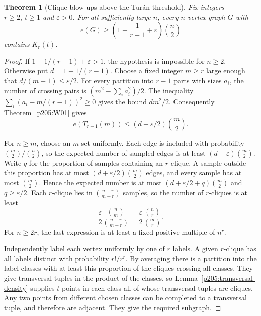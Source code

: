 \documentclass[11pt,oneside,openany]{book}
\theoremstyle{plain}
\newtheorem{theorem}{Theorem}[chapter]
\theoremstyle{definition}
\theoremstyle{remark}
\begin{document}
\begin{theorem}[Clique blow-ups above the Tur\'an threshold]\label{p205:W03}
Fix integers \(r\ge2,\ t\ge1\) and \(\varepsilon>0\). For all
sufficiently large \(n\), every \(n\)-vertex graph \(G\) with
\[
  e(G)\ge \left(1-\frac1{r-1}+\varepsilon\right)\binom n2
\]
contains \(K_r(t)\).
\end{theorem}
\begin{proof}
If \(1-1/(r-1)+\varepsilon>1\), the hypothesis is impossible for
\(n\ge2\). Otherwise put \(d=1-1/(r-1)\). Choose a fixed integer
\(m\ge r\) large enough that \(d/(m-1)\le\varepsilon/2\).
For every partition into \(r-1\) parts with sizes \(a_i\), the number
of crossing pairs is \((m^2-\sum_i a_i^2)/2\). The inequality
\(\sum_i(a_i-m/(r-1))^2\ge0\) gives the bound \(d m^2/2\).
Consequently Theorem~\ref{p205:W01} gives
\[
  e(T_{r-1}(m))\le(d+\varepsilon/2)\binom m2.
\]

For \(n\ge m\), choose an \(m\)-set uniformly. Each edge is included
with probability \(\binom m2/\binom n2\), so the expected number of
sampled edges is at least \((d+\varepsilon)\binom m2\). Write \(q\)
for the proportion of samples containing an \(r\)-clique. A sample
outside this proportion has at most \((d+\varepsilon/2)\binom m2\)
edges, and every sample has at most \(\binom m2\). Hence the
expected number is at most \((d+\varepsilon/2+q)\binom m2\) and
\(q\ge\varepsilon/2\). Each \(r\)-clique lies in
\(\binom{n-r}{m-r}\) samples, so the number of \(r\)-cliques is at
least
\[
  \frac{\varepsilon}{2}\frac{\binom nm}{\binom{n-r}{m-r}}
    =\frac{\varepsilon}{2}\frac{\binom nr}{\binom mr}.
\]
For \(n\ge2r\), the last expression is at least a fixed positive
multiple of \(n^r\).

Independently label each vertex uniformly by one of \(r\) labels.
A given \(r\)-clique has all labels distinct with probability
\(r!/r^r\). By averaging there is a partition into the label classes
with at least this proportion of the cliques crossing all classes.
They give transversal tuples in the product of the classes, so
Lemma~\ref{p205:transversal-density} supplies \(t\) points in each
class all of whose transversal tuples are cliques. Any two points
from different chosen classes can be completed to a transversal tuple,
and therefore are adjacent. They give the required subgraph.
\end{proof}
\end{document}
